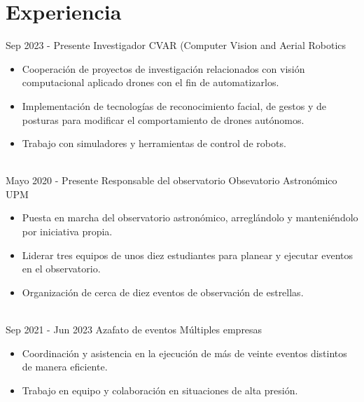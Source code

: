 \documentclass[letterpaper]{twentysecondcv} %
\begin{document}
\makeprofile %
 

\color{black!70}
\section{Experiencia}

\begin{twenty} %
\twentyitem
    	{Sep 2023 -}
		{Presente}
        {Investigador}
        {CVAR (Computer Vision and Aerial Robotics}
        {}
        {\begin{itemize}
        \item Cooperación de proyectos de investigación relacionados con visión computacional aplicado drones con el fin de automatizarlos.
        \item Implementación de tecnologías de reconocimiento facial, de gestos y de posturas para modificar el comportamiento de drones autónomos.
        \item Trabajo con simuladores y herramientas de control de robots.
        \end{itemize}}
        \\
	\twentyitem
    	{Mayo 2020 -}
		{Presente}
        {Responsable del observatorio}
        {Obsevatorio Astronómico UPM}
        {}
        {
        {\begin{itemize}
        \item Puesta en marcha del observatorio astronómico, arreglándolo y manteniéndolo por iniciativa propia.
        \item Liderar tres equipos de unos diez estudiantes para planear y ejecutar eventos en el observatorio.
        \item Organización de cerca de diez eventos de observación de estrellas.
    \end{itemize}}
        }
    \\   
    \twentyitem
   		{Sep 2021 -}
		{Jun 2023}
        {Azafato de eventos}
        {Múltiples empresas}
        {}
        {
        {\begin{itemize}
        \item Coordinación y asistencia en la ejecución de más de veinte eventos distintos de manera eficiente.
        \item Trabajo en equipo y colaboración en situaciones de alta presión.
    \end{itemize}}
        }
        
\end{twenty}
\end{document}
